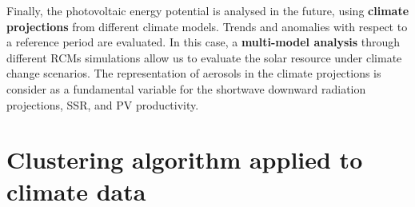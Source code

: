   
  Finally, the photovoltaic energy potential is analysed in the future, using \textbf{climate projections} from different climate models. Trends and anomalies with respect to a reference period are evaluated. In this case, a \textbf{multi-model analysis} through different RCMs simulations allow us to evaluate the solar resource under climate change scenarios. The representation of aerosols in the climate projections is consider as a fundamental variable for the shortwave downward radiation projections, SSR, and PV productivity.\\ 

  
\section{Clustering algorithm applied to climate data}


